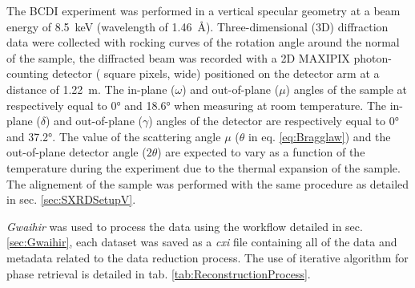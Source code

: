 The BCDI experiment was performed in a vertical specular geometry at a beam energy of \qty{8.5}{\keV} (wavelength of \qty{1.46}{\angstrom}).
Three-dimensional (3D) diffraction data were collected with rocking curves of the rotation angle around the normal of the sample, the diffracted beam was recorded with a 2D MAXIPIX photon-counting detector ( square pixels,  wide) positioned on the detector arm at a distance of \qty{1.22}{\meter}.
The in-plane ($\omega$) and out-of-plane ($\mu$) angles of the sample at respectively equal to \ang{0} and \ang{18.6} when measuring at room temperature.
The in-plane ($\delta$) and out-of-plane ($\gamma$) angles of the detector are respectively equal to \ang{0} and \ang{37.2}.
The value of the scattering angle $\mu$ ($\theta$ in eq. \ref{eq:Bragglaw}) and the out-of-plane detector angle ($2\theta$) are expected to vary as a function of the temperature during the experiment due to the thermal expansion of the sample.
The alignement of the sample was performed with the same procedure as detailed in sec. \ref{sec:SXRDSetupV}.

\textit{Gwaihir} was used to process the data using the workflow detailed in sec. \ref{sec:Gwaihir}, each dataset was saved as a \textit{cxi} file containing all of the data and metadata related to the data reduction process.
The use of iterative algorithm for phase retrieval is detailed in tab. \ref{tab:ReconstructionProcess}.

\begin{table}[!htb]
\centering
{}
\caption{Example of algorithm chain used in BCDI for the phase retrieval.}
\label{tab:ReconstructionProcess}
\end{table}

